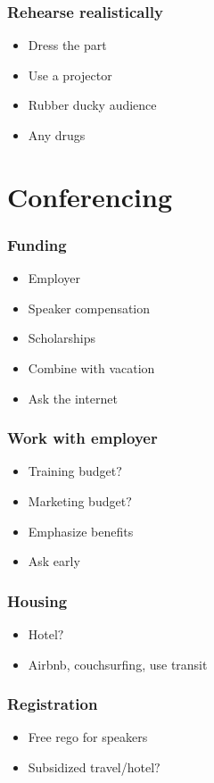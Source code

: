 \documentclass{beamer}
\begin{document}
\begin{frame}[fragile]
\frametitle{Rehearse realistically}
\begin{itemize}[<+(1)->]
\item Dress the part
\item Use a projector
\item Rubber ducky audience
\item Any drugs
\end{itemize}
\end{frame}

\section{Conferencing}

\begin{frame}[fragile]
\tableofcontents[currentsection]
\end{frame}

\begin{frame}[fragile]
\frametitle{Funding}
\begin{itemize}[<+(1)->]
\item Employer
\item Speaker compensation
\item Scholarships
\item Combine with vacation
\item Ask the internet
\end{itemize}
\end{frame}

\begin{frame}[fragile]
\frametitle{Work with employer }
\begin{itemize}[<+(1)->]
\item Training budget$?$
\item Marketing budget$?$
\item Emphasize benefits
\item Ask early
\end{itemize}
\end{frame}

\begin{frame}[fragile]
\frametitle{Housing}
\begin{itemize}[<+(1)->]
\item Hotel$?$
\item Airbnb, couchsurfing, use transit
\end{itemize}
\end{frame}

\begin{frame}[fragile]
\frametitle{Registration}
\begin{itemize}[<+(1)->]
\item Free rego for speakers
\item Subsidized travel/hotel$?$
\end{itemize}
\end{frame}
\end{document}
